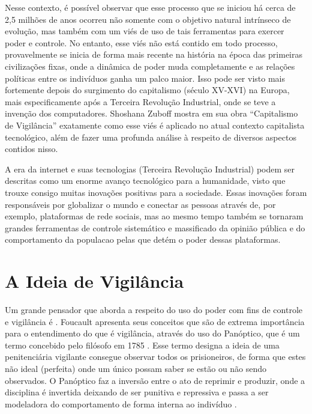 \documentclass[
	12pt,
	openright,
	twoside,
	a4paper,
	english,
	french,
	spanish,
	brazil
]{abntex2}
\begin{document}
  Nesse contexto, é possível observar que esse processo que se iniciou há cerca
  de 2,5 milhões de anos ocorreu não somente com o objetivo natural intrínseco
  de evolução, mas também com um viés de uso de tais ferramentas para exercer
  poder e controle. No entanto, esse viés não está contido em todo processo,
  provavelmente se inicia de forma mais recente na história na época das
  primeiras civilizações fixas, onde a dinâmica de poder muda completamente e as
  relações políticas entre os indivíduos ganha um palco maior. Isso pode ser
  visto mais fortemente depois do surgimento do capitalismo (século XV-XVI) na
  Europa, mais especificamente após a Terceira Revolução Industrial, onde se
  teve a invenção dos computadores. Shoshana Zuboff mostra em sua obra
  ``Capitalismo de Vigilância'' exatamente como esse viés é aplicado no atual
  contexto capitalista tecnológico, além de fazer uma profunda análise à
  respeito de diversos aspectos contidos nisso.

  A era da internet e suas tecnologias (Terceira Revolução Industrial) podem ser
  descritas como um enorme avanço tecnológico para a humanidade, visto que
  trouxe consigo muitas inovações positivas para a sociedade. Essas inovações
  foram responsáveis por globalizar o mundo e conectar as pessoas através de,
  por exemplo, plataformas de rede sociais, mas ao mesmo tempo também se
  tornaram grandes ferramentas de controle sistemático e massificado da opinião
  pública e do comportamento da populacao pelas que detém o poder dessas
  plataformas.

  \chapter{A Ideia de Vigilância}

  Um grande pensador que aborda a respeito do uso do poder com fins de controle
  e vigilância é . Foucault apresenta
  seus conceitos que são de extrema importância para o entendimento do que é
  vigilância, através do uso do Panóptico, que é um termo concebido pelo
  filósofo  em 1785
  \cite{bentham-panoptico}. Esse termo designa a ideia de uma penitenciária
  vigilante consegue observar todos os prisioneiros, de forma que estes não
  ideal (perfeita) onde um único possam saber se estão ou não sendo observados.
  O Panóptico faz a inversão entre o ato de reprimir e produzir, onde a
  disciplina é invertida deixando de ser punitiva e repressiva e passa a ser
  modeladora do comportamento de forma interna ao indivíduo
  \cite{trindade-foucault-panoptico}.
\end{document}
